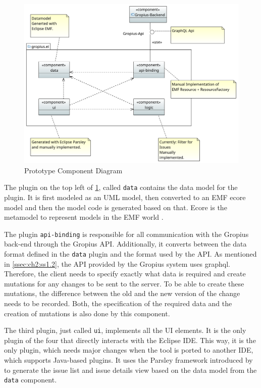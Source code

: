 \begin{figure}[!h]
	\centering
	\includegraphics[width=\textwidth]{graphics/Component_Diagram.png}
	\caption{Prototype Component Diagram}
	\label{fig:c4:component_diagram}
\end{figure}

The plugin on the top left of \cref{fig:c4:component_diagram}, called \lstinline|data| contains the data model for the plugin. 
It is first modeled as an \gls{UML} model, then converted to an \gls{EMF} ecore model and then the model code is generated based on that.
Ecore is the metamodel to represent models in the \gls{EMF} world \cite{steinberg2008emf}.

The plugin \lstinline|api-binding| is responsible for all communication with the \gls{Gropius} back-end through the \gls{Gropius} \gls{API}.
Additionally, it converts between the data format defined in the \lstinline|data| plugin and the format used by the \gls{API}.
As mentioned in \cref{ssec:ch2:ss1.2}, the \gls{API} provided by the Gropius system uses \gls{graphql}.
Therefore, the client needs to specify exactly what data is required and create mutations for any changes to be sent to the server.
To be able to create these mutations, the difference between the old and the new version of the change needs to be recorded.
Both, the specification of the required data and the creation of mutations is also done by this component.

The third plugin, just called \lstinline|ui|, implements all the \gls{UI} elements.
It is the only plugin of the four that directly interacts with the \gls{Eclipse} \gls{IDE}.
This way, it is the only plugin, which needs major changes when the tool is ported to another \gls{IDE}, which supports Java-based plugins.
It uses the \gls{Parsley} framework introduced by \cite{bettini2014developing} to generate the issue list and issue details view 
based on the data model from the \lstinline|data| component.

